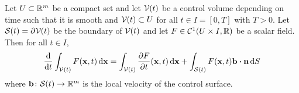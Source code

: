 \begin{theorem}
	Let $U \subset \mathbb{R}^m$ be a compact set and let $\mathcal{V}_{}(t)$ be a control volume depending on time such that it is smooth and $\mathcal{V}_{}(t) \subset U$ for all $t \in I = [0, T]$ with $T > 0$. Let $\mathcal{S}_{}(t) = \partial \mathcal{V}_{}(t)$ be the boundary of $\mathcal{V}_{}(t)$ and let $F \in \mathcal{C}^1(U \times I, \mathbb{R})$ be a scalar field. Then for all $t \in I$,
	\begin{equation} \label{eq:reynolds_transport_theorem}
		\frac{\dd}{\dd{t}} \int_\cvt F(\vb{x}, t) \dd{\vb{x}} = 
		\int_\cvt \frac{\partial F}{\partial t} (\vb{x}, t) \dd{\vb{x}} + 
		\int_\cst F(\vb{x}, t) \vb{b} \vdot \vb{n} \dd{S}
	\end{equation}
	where $\vb{b} \colon \mathcal{S}_{}(t) \rightarrow \mathbb{R}^m$ is the local velocity of the control surface.
\end{theorem}
